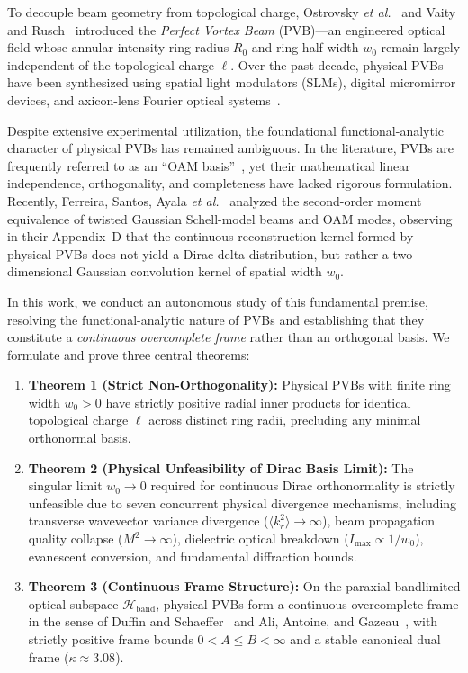 \documentclass[11pt,a4paper]{article}
\begin{document}
To decouple beam geometry from topological charge, Ostrovsky \emph{et al.}~\cite{Ostrovsky2013} and Vaity and Rusch~\cite{Vaity2015} introduced the \emph{Perfect Vortex Beam} (PVB)---an engineered optical field whose annular intensity ring radius $R_0$ and ring half-width $w_0$ remain largely independent of the topological charge $\ell$. Over the past decade, physical PVBs have been synthesized using spatial light modulators (SLMs), digital micromirror devices, and axicon-lens Fourier optical systems~\cite{Arrizon2007,Chen2013,Reddy2016}.

Despite extensive experimental utilization, the foundational functional-analytic character of physical PVBs has remained ambiguous. In the literature, PVBs are frequently referred to as an ``OAM basis''~\cite{GarciaEscartin2008}, yet their mathematical linear independence, orthogonality, and completeness have lacked rigorous formulation. Recently, Ferreira, Santos, Ayala \emph{et al.}~\cite{Ferreira2026} analyzed the second-order moment equivalence of twisted Gaussian Schell-model beams and OAM modes, observing in their Appendix~D that the continuous reconstruction kernel formed by physical PVBs does not yield a Dirac delta distribution, but rather a two-dimensional Gaussian convolution kernel of spatial width $w_0$.

In this work, we conduct an autonomous study of this fundamental premise, resolving the functional-analytic nature of PVBs and establishing that they constitute a \emph{continuous overcomplete frame} rather than an orthogonal basis. We formulate and prove three central theorems:
\begin{enumerate}
    \item \textbf{Theorem 1 (Strict Non-Orthogonality):} Physical PVBs with finite ring width $w_0 > 0$ have strictly positive radial inner products for identical topological charge $\ell$ across distinct ring radii, precluding any minimal orthonormal basis.
    \item \textbf{Theorem 2 (Physical Unfeasibility of Dirac Basis Limit):} The singular limit $w_0 \to 0$ required for continuous Dirac orthonormality is strictly unfeasible due to seven concurrent physical divergence mechanisms, including transverse wavevector variance divergence ($\langle k_r^2 \rangle \to \infty$), beam propagation quality collapse ($M^2 \to \infty$), dielectric optical breakdown ($I_{\max} \propto 1/w_0$), evanescent conversion, and fundamental diffraction bounds.
    \item \textbf{Theorem 3 (Continuous Frame Structure):} On the paraxial bandlimited optical subspace $\mathcal{H}_{\text{band}}$, physical PVBs form a continuous overcomplete frame in the sense of Duffin and Schaeffer~\cite{Duffin1952} and Ali, Antoine, and Gazeau~\cite{Ali1993}, with strictly positive frame bounds $0 < A \le B < \infty$ and a stable canonical dual frame ($\kappa \approx 3.08$).
\end{enumerate}
\end{document}
